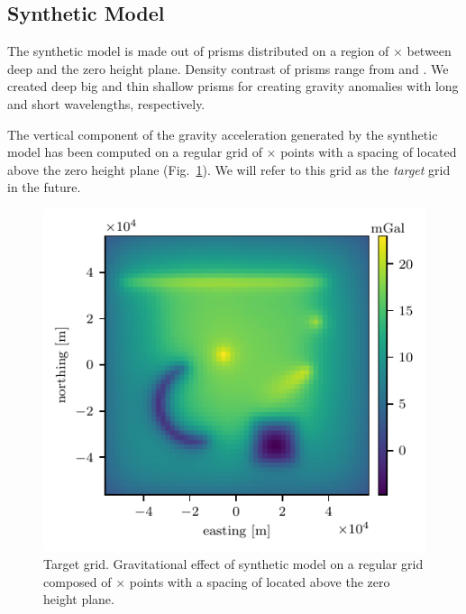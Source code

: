 \documentclass[twocolumn]{article}
\begin{document}
\subsection{Synthetic Model}


The synthetic model is made out of \NPrisms{} prisms distributed on a region of
\ModelEasting{}$\times$\ModelNorthing{} between \ModelDepth{} deep and the zero
height plane.
Density contrast of prisms range from \ModelMinDensity{} and
\ModelMaxDensity{}.
We created deep big and thin shallow prisms for creating gravity anomalies with
long and short wavelengths, respectively.

The vertical component of the gravity acceleration generated by the synthetic
model has been computed on a regular grid of
\TargetEastingSize{}$\times$\TargetNorthingSize{} points with a spacing of
\TargetSpacing{} located \TargetHeight{} above the zero height plane
(Fig.~\ref{fig:target-grid}).
We will refer to this grid as the \emph{target} grid in the future.

\begin{figure}
    \includegraphics[width=\linewidth]{figs/target-grid.pdf}
    \caption{
        Target grid. Gravitational effect of synthetic model on a regular grid
        composed of \TargetEastingSize{}$\times$\TargetNorthingSize{} points
        with a spacing of \TargetSpacing{} located \TargetHeight{} above the
        zero height plane.
    }
    \label{fig:target-grid}
\end{figure}
\end{document}
